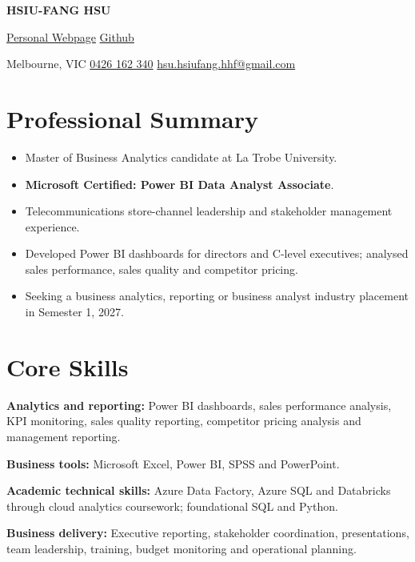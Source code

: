 \documentclass[11pt,a4paper]{article}
\newcommand{\skill}[2]{\textbf{#1} #2\par}
\begin{document}
{\fontsize{26}{30}\selectfont\bfseries\color{ink} HSIU-FANG HSU}\par
\vspace{3pt}
{ \href{https://hsiufangg.github.io/}{Personal Webpage} { \textbar{} \href{https://github.com/hsiufangg}{Github}}}\par
Melbourne, VIC \textbar{} \href{tel:+61426162340}{0426 162 340} \textbar{}
\href{mailto:hsu.hsiufang.hhf@gmail.com}{hsu.hsiufang.hhf@gmail.com}

\section{Professional Summary}
\begin{itemize}
\item Master of Business Analytics candidate at La Trobe University.
\item \textbf{Microsoft Certified: Power BI Data Analyst Associate}.
\item Telecommunications store-channel leadership and stakeholder management experience.
\item Developed Power BI dashboards for directors and C-level executives; analysed sales performance, sales quality and competitor pricing.
\item Seeking a business analytics, reporting or business analyst industry placement in Semester 1, 2027.
\end{itemize}

\section{Core Skills}
\skill{Analytics and reporting:}{Power BI dashboards, sales performance analysis, KPI monitoring, sales quality reporting, competitor pricing analysis and management reporting.}
\skill{Business tools:}{Microsoft Excel, Power BI, SPSS and PowerPoint.}
\skill{Academic technical skills:}{Azure Data Factory, Azure SQL and Databricks through cloud analytics coursework; foundational SQL and Python.}
\skill{Business delivery:}{Executive reporting, stakeholder coordination, presentations, team leadership, training, budget monitoring and operational planning.}
\end{document}
